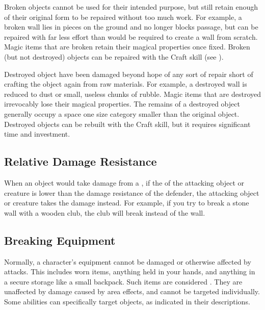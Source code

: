     Broken objects cannot be used for their intended purpose, but still retain enough of their original form to be repaired without too much work.
    For example, a broken wall lies in pieces on the ground and no longer blocks passage, but can be repaired with far less effort than would be required to create a wall from scratch.
    Magic items that are broken retain their magical properties once fixed.
    Broken (but not destroyed) objects can be repaired with the Craft skill (see ).

    Destroyed object have been damaged beyond hope of any sort of repair short of crafting the object again from raw materials.
    For example, a destroyed wall is reduced to dust or small, useless chunks of rubble.
    Magic items that are destroyed irrevocably lose their magical properties.
    The remains of a destroyed object generally occupy a space one size category smaller than the original object.
    Destroyed objects can be rebuilt with the Craft skill, but it requires significant time and investment.

  \subsection{Relative Damage Resistance}\label{Relative Damage Resistance}
    When an object would take damage from a , if the  of the attacking object or creature is lower than the damage resistance of the defender, the attacking object or creature takes the damage instead.
    For example, if you try to break a stone wall with a wooden club, the club will break instead of the wall.

  \subsection{Breaking Equipment}\label{Breaking Equipment}
    Normally, a character's equipment cannot be damaged or otherwise affected by attacks.
    This includes worn items, anything held in your hands, and anything in a secure storage like a small backpack.
    Such items are considered .
    They are unaffected by damage caused by area effects, and cannot be targeted individually.
    Some abilities can specifically target  objects, as indicated in their descriptions.

